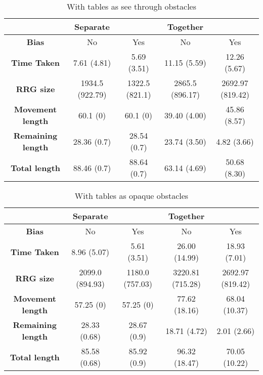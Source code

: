 
\begin{table}
    \centering
    \tiny
    \begin{tabular}{|c|c|c|c|c|}
		\hline
		\textbf{} & \textbf{Separate} & \textbf{} & \textbf{Together} & \textbf{}\\
		\hline
		\textbf{Bias}             & No & Yes & No & Yes \\
		\hline
		\textbf{Time Taken}       & 7.61 (4.81) & 5.69 (3.51) & 11.15 (5.59) & 12.26 (5.67) \\
		\hline 
		\textbf{RRG size}         & 1934.5 (922.79) & 1322.5 (821.1)  & 2865.5 (896.17) & 2692.97 (819.42) \\
		\hline
		\textbf{Movement length}  & 60.1 (0)    & 60.1 (0)    & 39.40 (4.00) & 45.86 (8.57) \\
		\hline
		\textbf{Remaining length} & 28.36 (0.7) & 28.54 (0.7) & 23.74 (3.50) & 4.82 (3.66) \\
		\hline
		\textbf{Total length}     & 88.46 (0.7) & 88.64 (0.7) & 63.14 (4.69) & 50.68 (8.30) \\
		\hline
	\end{tabular}
    \caption{With tables as see through obstacles
    \label{tab:resultsseethrough}}
\end{table}

\begin{table}
    \centering
    \tiny
    \begin{tabular}{|c|c|c|c|c|}
		\hline
		\textbf{} & \textbf{Separate} & \textbf{} & \textbf{Together} & \textbf{}\\
		\hline
		\textbf{Bias}             & No & Yes & No & Yes \\
		\hline
		\textbf{Time Taken}       & 8.96 (5.07) & 5.61 (3.51) & 26.00 (14.99) & 18.93 (7.01) \\
		\hline 
		\textbf{RRG size}         & 2099.0 (894.93) & 1180.0 (757.03) & 3220.81 (715.28) & 2692.97 (819.42) \\
		\hline
		\textbf{Movement length}  & 57.25 (0)    & 57.25 (0)   & 77.62 (18.16) & 68.04 (10.37) \\
		\hline
		\textbf{Remaining length} & 28.33 (0.68) & 28.67 (0.9) & 18.71 (4.72) & 2.01 (2.66) \\
		\hline
		\textbf{Total length}     & 85.58 (0.68) & 85.92 (0.9) & 96.32 (18.47) & 70.05 (10.22) \\
		\hline
	\end{tabular}
    \caption{With tables as opaque obstacles
    \label{tab:resultsopaque}}
\end{table}


